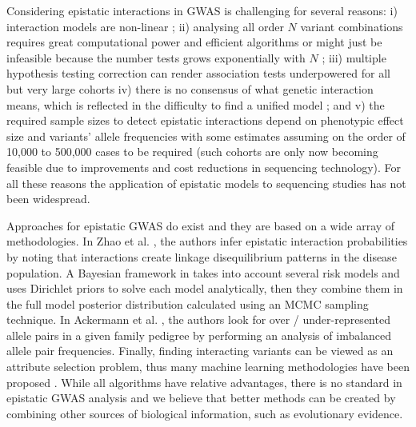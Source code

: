 Considering epistatic interactions in GWAS is challenging for several reasons: 
i) interaction models are non-linear \cite{gao2010classification}; 
ii) analysing all order $N$ variant combinations requires great computational power and efficient algorithms or might just be infeasible because the number tests grows exponentially with $N$ \cite{phillips2008epistasis}; 
iii) multiple hypothesis testing correction can render association tests underpowered for all but very large cohorts \cite{gao2010classification, phillips2008epistasis}
iv) there is no consensus of what genetic interaction means, which is reflected in the difficulty to find a unified model \cite{phillips2008epistasis,mani2008defining}; and 
v) the required sample sizes to detect epistatic interactions depend on phenotypic effect size and variants' allele frequencies with some estimates assuming on the order of 10,000 to 500,000 cases \cite{jostins2013using} to be required (such cohorts are only now becoming feasible due to improvements and cost reductions in sequencing technology).
For all these reasons the application of epistatic models to sequencing studies has not been widespread.

Approaches for epistatic GWAS do exist and they are based on a wide array of methodologies. 
In Zhao et al. \cite{zhao2006test}, the authors infer epistatic interaction probabilities by noting that interactions create linkage disequilibrium patterns in the disease population. 
A Bayesian framework in \cite{zhang2007bayesian} takes into account several risk models and uses Dirichlet priors to solve each model analytically, then they combine them in the full model posterior distribution calculated using an MCMC sampling technique. 
In Ackermann et al. \cite{ackermann2012systematic}, the authors look for over / under-represented allele pairs in a given family pedigree by performing an analysis of imbalanced allele pair frequencies.
Finally, finding interacting variants can be viewed as an attribute selection problem, thus many machine learning methodologies have been proposed \cite{mckinney2006machine}. 
While all algorithms have relative advantages, there is no standard in epistatic GWAS analysis and we believe that better methods can be created by combining other sources of biological information, such as evolutionary evidence.

